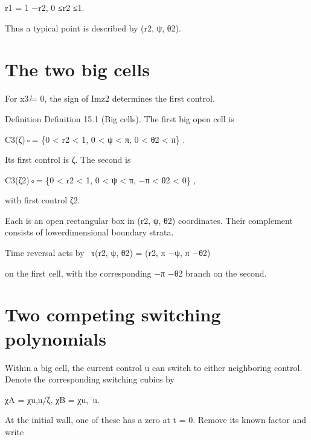 \begin{displaytext}
r1 = 1 −r2, 0 ≤r2 ≤1.
\end{displaytext}

Thus a typical point is described by (r2, ψ, θ2).


\section{The two big cells}

For x3 ̸= 0, the sign of Imz2 determines the first control.


\begin{statementbox}{Definition}
Definition 15.1 (Big cells). The first big open cell is
\end{statementbox}

\begin{displaytext}
C3(ζ)◦= \{0 < r2 < 1, 0 < ψ < π, 0 < θ2 < π\} .
\end{displaytext}

Its first control is ζ. The second is


\begin{displaytext}
C3(ζ2)◦= \{0 < r2 < 1, 0 < ψ < π, −π < θ2 < 0\} ,
\end{displaytext}

with first control ζ2.


Each is an open rectangular box in (r2, ψ, θ2) coordinates. Their complement consists of lowerdimensional boundary strata.


\begin{displaytext}
Time reversal acts by \
τ(r2, ψ, θ2) = (r2, π −ψ, π −θ2)
\end{displaytext}

on the first cell, with the corresponding −π −θ2 branch on the second.


\section{Two competing switching polynomials}

Within a big cell, the current control u can switch to either neighboring control. Denote the corresponding switching cubics by


\begin{displaytext}
χA = χu,u/ζ, χB = χu,¯u.
\end{displaytext}

At the initial wall, one of these has a zero at t = 0. Remove its known factor and write


